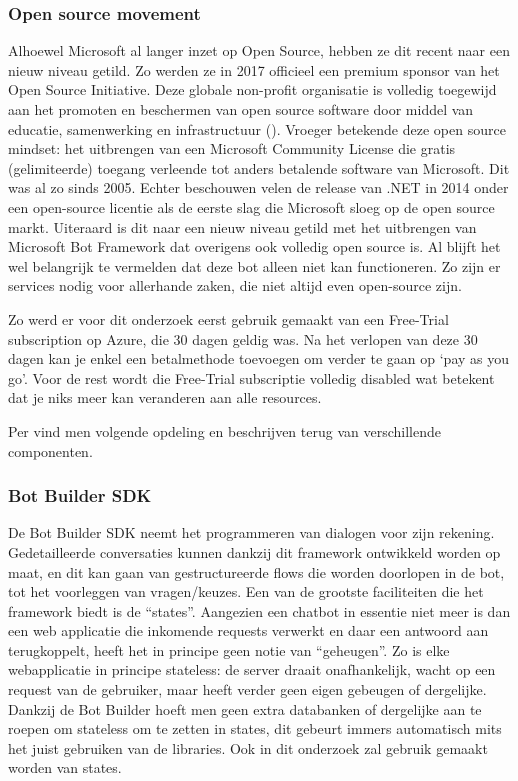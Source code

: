 \subsubsection{Open source movement} 
Alhoewel Microsoft al langer inzet op Open Source, hebben ze dit recent naar een nieuw niveau getild. Zo werden ze in 2017 officieel een premium sponsor van het Open Source Initiative. Deze globale non-profit organisatie is volledig toegewijd aan het promoten en beschermen van open source software door middel van educatie, samenwerking en infrastructuur (\textcite{OSI2017}). 
Vroeger betekende deze open source mindset: het uitbrengen van een Microsoft Community License die gratis (gelimiteerde) toegang verleende tot anders betalende software van Microsoft. Dit was al zo sinds 2005. Echter beschouwen velen de release van .NET in 2014 onder een open-source licentie als de eerste slag die Microsoft sloeg op de open source markt. Uiteraard is dit naar een nieuw niveau getild met het uitbrengen van Microsoft Bot Framework dat overigens ook volledig open source is. Al blijft het wel belangrijk te vermelden dat deze bot alleen niet kan functioneren. Zo zijn er services nodig voor allerhande zaken, die niet altijd even open-source zijn. 

Zo werd er voor dit onderzoek eerst gebruik gemaakt van een Free-Trial subscription op Azure, die 30 dagen geldig was. Na het verlopen van deze 30 dagen kan je enkel een betalmethode toevoegen om verder te gaan op `pay as you go'. Voor de rest wordt die Free-Trial subscriptie volledig disabled wat betekent dat je niks meer kan veranderen aan alle resources.


Per \textcite{delta-n2019} vind men volgende opdeling en beschrijven terug van verschillende componenten.
\subsubsection{Bot Builder SDK}
De Bot Builder SDK neemt het programmeren van dialogen voor zijn rekening. Gedetailleerde conversaties kunnen dankzij dit framework ontwikkeld worden op maat, en dit kan gaan van gestructureerde flows die worden doorlopen in de bot, tot het voorleggen van vragen/keuzes. Een van de grootste faciliteiten die het framework biedt is de “states”. Aangezien een chatbot in essentie niet meer is dan een web applicatie die inkomende requests verwerkt en daar een antwoord aan terugkoppelt, heeft het in principe geen notie van “geheugen”. Zo is elke webapplicatie in principe stateless: de server draait onafhankelijk, wacht op een request van de gebruiker, maar heeft verder geen eigen gebeugen of dergelijke. Dankzij de Bot Builder hoeft men geen extra databanken of dergelijke aan te roepen om stateless om te zetten in states, dit gebeurt immers automatisch mits het juist gebruiken van de libraries. Ook in dit onderzoek zal gebruik gemaakt worden van states. 

